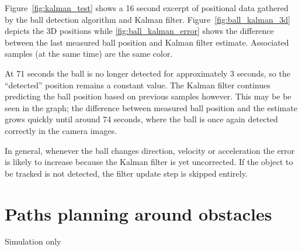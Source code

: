 Figure~\ref{fig:kalman_test} shows a 16 second excerpt of positional data gathered by the ball detection algorithm and Kalman filter.
Figure~\ref{fig:ball_kalman_3d} depicts the 3D positions while \ref{fig:ball_kalman_error} shows the difference between the last measured ball position and Kalman filter estimate. Associated samples (at the same time) are the same color.

At 71 seconds the ball is no longer detected for approximately 3 seconds, so the ``detected'' position remains a constant value. The Kalman filter continues predicting the ball position based on previous samples however. This may be be seen in the graph; the difference between measured ball position and the estimate grows quickly until around 74 seconds, where the ball is once again detected correctly in the camera images.

In general, whenever the ball changes direction, velocity or acceleration the error is likely to increase because the Kalman filter is yet uncorrected. If the object to be tracked is not detected, the filter update step is skipped entirely.


\section{Paths planning around obstacles}
Simulation only
